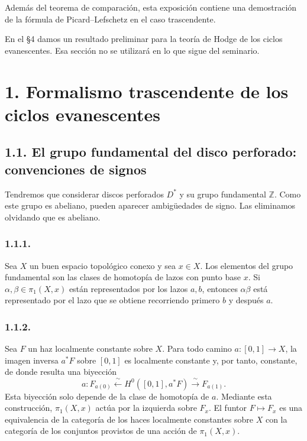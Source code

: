 Además del teorema de comparación, esta exposición contiene una demostración de
la fórmula de Picard--Lefschetz en el caso trascendente.

\pageoriginale

En el §4 damos un resultado preliminar para la teoría de Hodge de los ciclos
evanescentes. Esa sección no se utilizará en lo que sigue del seminario.

\section*{1. Formalismo trascendente de los ciclos evanescentes}

\subsection*{1.1. El grupo fundamental del disco perforado: convenciones de
signos}

Tendremos que considerar discos perforados $D^*$ y su grupo fundamental
$\mathbb Z$. Como este grupo es abeliano, pueden aparecer ambigüedades de
signo. Las eliminamos olvidando que es abeliano.

\subsubsection*{1.1.1.}
Sea $X$ un buen espacio topológico conexo y sea $x\in X$. Los elementos del
grupo fundamental son las clases de homotopía de lazos con punto base $x$. Si
$\alpha,\beta\in\pi_1(X,x)$ están representados por los lazos $a,b$, entonces
$\alpha\beta$ está representado por el lazo que se obtiene recorriendo primero
$b$ y después $a$.

\subsubsection*{1.1.2.}
Sea $F$ un haz localmente constante sobre $X$. Para todo camino
$a:[0,1]\longrightarrow X$, la imagen inversa $a^*F$ sobre $[0,1]$ es
localmente constante y, por tanto, constante, de donde resulta una biyección
\[
a:F_{a(0)}
\xleftarrow{\ \sim\ }H^0([0,1],a^*F)
\xrightarrow{\ \sim\ }F_{a(1)}.
\]
Esta biyección solo depende de la clase de homotopía de $a$. Mediante esta
construcción, $\pi_1(X,x)$ actúa por la izquierda sobre $F_x$. El funtor
$F\longmapsto F_x$ es una equivalencia de la categoría de los haces localmente
constantes sobre $X$ con la categoría de los conjuntos provistos de una acción
de $\pi_1(X,x)$.

